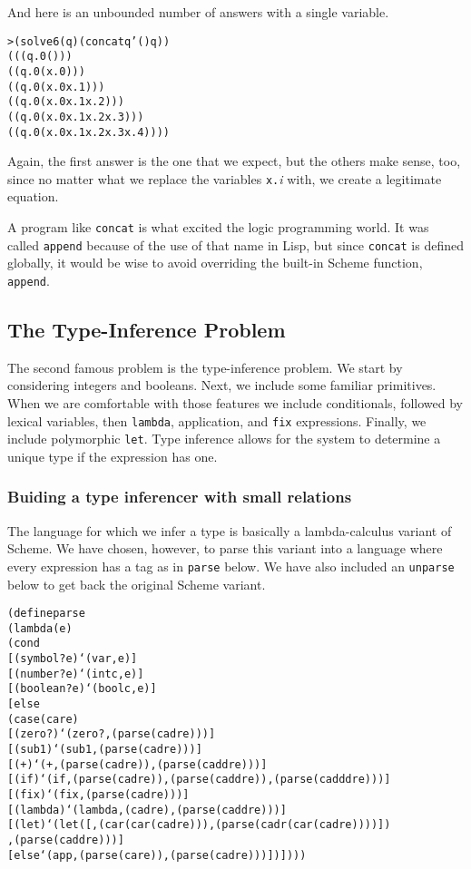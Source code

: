 And here is an unbounded number of answers with a single variable.

\begin{alltt}
> (solve 6 (q) (concat q '() q))
(((q.0 ()))
 ((q.0 (x.0)))
 ((q.0 (x.0 x.1)))
 ((q.0 (x.0 x.1 x.2)))
 ((q.0 (x.0 x.1 x.2 x.3)))
 ((q.0 (x.0 x.1 x.2 x.3 x.4))))
\end{alltt}

\noindent
Again, the first answer is the one that we expect, but
the others make sense, too, since no matter what we replace
the variables \texttt{x.}\emph{i} with, we create a
legitimate equation.

A program like \texttt{concat} is what excited the
logic programming world.  It was called \texttt{append}
because of the use of that name in Lisp, but since
\texttt{concat} is defined globally, it would be wise to
avoid overriding the built-in Scheme function, \texttt{append}.

\subsection{The Type-Inference Problem}

The second famous problem is the type-inference problem.  We start by
considering integers and booleans.  Next, we include some familiar
primitives.  When we are comfortable with those features we include
conditionals, followed by lexical variables, then \texttt{lambda},
application, and \texttt{fix} expressions. Finally, we include
polymorphic \texttt{let}.  Type inference allows for the system to
determine a unique type if the expression has one.

\subsubsection{Buiding a type inferencer with small relations}

The language for which we infer a type is basically a lambda-calculus
variant of Scheme.  We have chosen, however, to parse this variant
into a language where every expression has a tag as in \texttt{parse}
below.  We have also included an \texttt{unparse} below to get back
the original Scheme variant.

\begin{alltt}
(define parse
  (lambda (e)
    (cond
      [(symbol? e) `(var ,e)]
      [(number? e) `(intc ,e)]
      [(boolean? e) `(boolc ,e)]
      [else
        (case (car e)
          [(zero?) `(zero? ,(parse (cadr e)))]
          [(sub1) `(sub1 ,(parse (cadr e)))]
          [(+) `(+ ,(parse (cadr e)) ,(parse (caddr e)))]
          [(if) `(if ,(parse (cadr e)) ,(parse (caddr e)) ,(parse (cadddr e)))]
          [(fix) `(fix ,(parse (cadr e)))]
          [(lambda) `(lambda ,(cadr e) ,(parse (caddr e)))]
          [(let) `(let ([,(car (car (cadr e))) ,(parse (cadr (car (cadr e))))])
                    ,(parse (caddr e)))]
          [else `(app ,(parse (car e)) ,(parse (cadr e)))])])))
\end{alltt}

